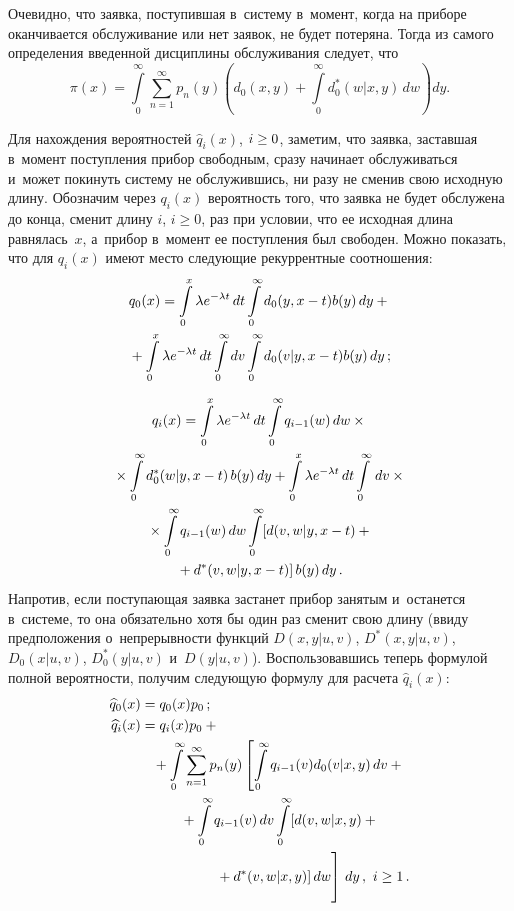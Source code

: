 \begin{multicols}{2}
Очевидно, что заявка, поступившая в~систему в~момент, когда на приборе
оканчивается обслуживание или нет заявок, не будет потеряна. Тогда из самого определения введенной дисциплины обслуживания следует, что
$$
\pi(x)= \int\limits_0^\infty \! \sum\limits_{n=1}^\infty p_n(y)
\left(\!d_0(x,y)+\!\int\limits_0^\infty\! d_0^*(w|x,y)\, dw\!\right)dy.
$$


Для нахождения вероятностей ${\widehat{q}_i(x)}$, $i\hm\ge 0$,
заметим, что заявка, заставшая в~момент поступления прибор свободным,
сразу начинает обслуживаться и~может покинуть систему не обслужившись,
ни разу не сменив свою исходную длину. Обозначим через
${q}_i(x)$ вероятность того, что заявка не будет обслужена до конца,
сменит длину $i$, $i\ge 0$, раз при условии, что ее исходная длина равнялась~$x$, а~прибор в~момент ее поступления был свободен.
Можно показать, что для ${q}_i(x)$  имеют место следующие рекуррентные соотношения:
\begin{multline*}
{q}_0(x)= \int\limits_0^x \lambda e^{-\lambda t}\,dt
\int\limits_0^\infty d_0(y,x-t) b(y)\, dy
+{}\\
{}+
\int\limits_0^x \lambda e^{-\lambda t}\,dt
\int\limits_0^\infty
dv \int\limits_0^\infty d_0(v|y,x-t) b(y)\, dy\,;
\end{multline*}

\vspace*{-12pt}

\noindent
\begin{multline*}
{q}_i(x)= \int\limits_0^x \lambda e^{-\lambda t}\,dt
\int\limits_0^\infty {q}_{i-1}(w) \, dw\times{}\\
{}\times
\int\limits_0^\infty d^*_0(w|y,x-t)\, b(y)\, dy
+
\int\limits_0^x \lambda e^{-\lambda t}\,dt \int\limits_0^\infty \, dv\times{}\\
{}\times
\int\limits_0^\infty {q}_{i-1}(w) \, dw
\int\limits_0^\infty [d(v,w|y,x-t)+{}\\
{}+d^*(v,w|y,x-t)]\, b(y)\, dy\,.
\end{multline*}
Напротив, если поступающая
заявка застанет прибор занятым и~останется в~системе,
то она обязательно хотя бы один раз сменит свою длину\linebreak
 (ввиду предположения
о~непрерывности функций $D(x,y|u,v)$, $D^*(x,y|u,v)$, $D_0(x|u,v)$,
$D_0^*(y|u,v)$ и~$D(y|u,v)$). Воспользовавшись теперь формулой полной вероятности,
получим следующую формулу для расчета ${\widehat{q}_i(x)}$:
\begin{align*}
\widehat{q}_0(x) &= {q}_0(x)p_0\,;
\\
{\widehat{q}_i(x)}&= {q}_i(x)p_0+{}\\
&\hspace*{3mm}{}+
\int\limits_0^\infty \sum\limits_{n=1}^\infty p_n(y)
\left [ \int\limits_0^\infty {q}_{i-1}(v)d_0(v|x,y)\,dv
+{}\right.\\
&\hspace*{10mm}{}+
\int\limits_0^\infty {q}_{i-1}(v)\,dv
\int\limits_0^\infty [d(v,w|x,y)+{}\\
&\hspace*{18mm}\left.{}+d^*(v,w|x,y)]\,dw
\vphantom{\int\limits_0^\infty {q}_{i-1}}
\right]\,dy\,, \ i\ge 1\,.
\end{align*}


\end{multicols}
